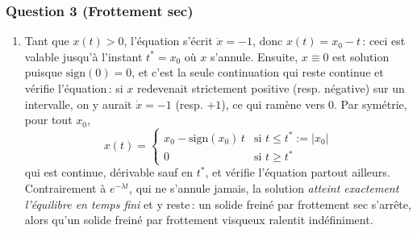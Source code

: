 \hypertarget{ed2-answer-impl-3}{%
\subsubsection*{Question 3 (Frottement sec)}\label{ed2-answer-impl-3}}


\begin{enumerate}
\def\labelenumi{\alph{enumi})}
\item
  Tant que \(x(t)>0\), l'équation s'écrit \(\dot{x}=-1\), donc
  \(x(t) = x_0 - t\)\,: ceci est valable jusqu'à l'instant
  \(t^* = x_0\) où \(x\) s'annule. Ensuite, \(x\equiv 0\) est solution
  puisque \(\mathrm{sign}(0)=0\), et c'est la seule continuation qui
  reste continue et vérifie l'équation\,: si \(x\) redevenait strictement
  positive (resp. négative) sur un intervalle, on y aurait
  \(\dot x = -1\) (resp. \(+1\)), ce qui ramène vers 0. Par symétrie,
  pour tout \(x_0\), \[
  x(t) = \begin{cases} x_0 - \mathrm{sign}(x_0)\, t & \text{si } t\leq t^* := |x_0| \\ 0 & \text{si } t\geq t^* \end{cases}
  \] qui est continue, dérivable sauf en \(t^*\), et vérifie l'équation
  partout ailleurs. Contrairement à \(e^{-\lambda t}\), qui ne s'annule
  jamais, la solution \emph{atteint exactement l'équilibre en temps fini}
  et y reste\,: un solide freiné par frottement sec s'arrête, alors
  qu'un solide freiné par frottement visqueux ralentit indéfiniment.


\end{enumerate}
